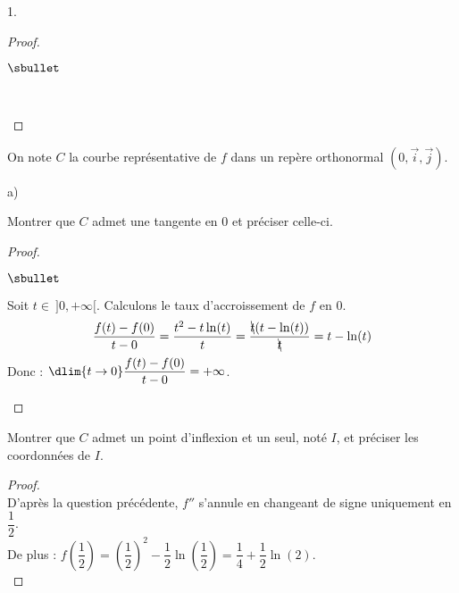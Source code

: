 \begin{noliste}{1.}
\begin{proof}
\begin{noliste}{$\sbullet$}
  \begin{center}
     \end{center}~\\[-1.6cm]
 \end{noliste}
\end{proof}

\item On note $C$ la courbe représentative de $f$ dans un repère 
orthonormal $(0, \vec{i} ,\vec{j})$.
\begin{noliste}{a)}
\item Montrer que $C$ admet une tangente en $0$ et préciser celle-ci.

\begin{proof}~
 \begin{noliste}{$\sbullet$}
  \item Soit $t\in \ ]0,+\infty[$. Calculons le taux d'accroissement
  de $f$ en $0$.
  \[
   \dfrac{f(t)-f(0)}{t-0} = \dfrac{t^2-t\ln(t)}{t} = \dfrac{\bcancel{t}
   (t-\ln(t))}{\bcancel{t}} = t-\ln(t)
  \]
  Donc : $\dlim{t\to 0} \dfrac{f(t)-f(0)}{t-0} = +\infty$.%
  ~\\[-1.4cm]
 \end{noliste}
\end{proof}


\item Montrer que $C$ admet un point d'inflexion et un seul, noté $I$, 
et préciser les coordonnées de $I$.

\begin{proof}~\\
  D'après la question précédente, $f''$ s'annule en changeant de signe
  uniquement en $\dfrac{1}{2}$.\\
  De plus : $f\left(\dfrac{1}{2}\right) = \left(\dfrac{1}{2}\right)^2
  - \dfrac{1}{2}\ln\left(\dfrac{1}{2}\right) =
  \dfrac{1}{4}+\dfrac{1}{2} \ln(2)$.%
  ~\\[-1cm]
\end{proof}



\end{noliste}
\end{noliste}
